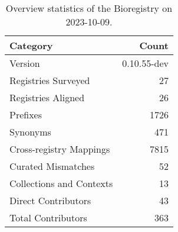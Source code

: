 \begin{table}
\caption{Overview statistics of the Bioregistry on 2023-10-09.}
\label{tab:bioregistry-summary}
\begin{tabular}{lr}
\toprule
Category & Count \\
\midrule
Version & 0.10.55-dev \\
Registries Surveyed & 27 \\
Registries Aligned & 26 \\
Prefixes & 1726 \\
Synonyms & 471 \\
Cross-registry Mappings & 7815 \\
Curated Mismatches & 52 \\
Collections and Contexts & 13 \\
Direct Contributors & 43 \\
Total Contributors & 363 \\
\bottomrule
\end{tabular}
\end{table}
